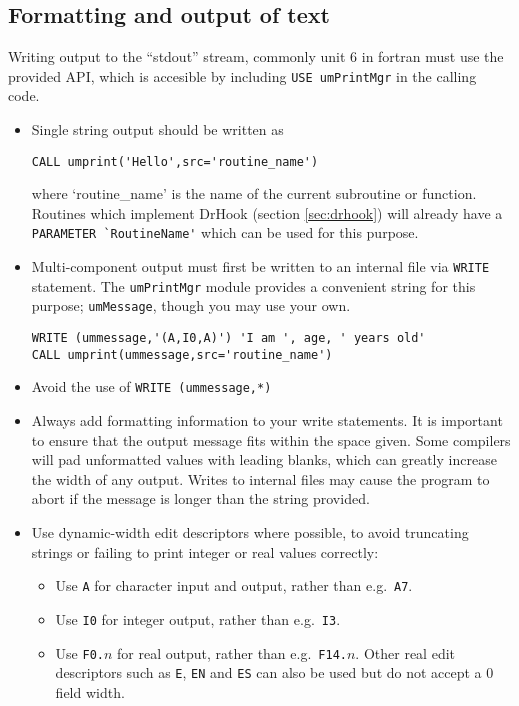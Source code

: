 \subsection{Formatting and output of text}\label{sec:format}

Writing output to the ``stdout'' stream, commonly unit 6 in fortran must use the provided API, which is accesible by including \verb|USE umPrintMgr| in the calling code.
\begin{itemize}
\item Single string output should be written as
\begin{verbatim}
CALL umprint('Hello',src='routine_name')
\end{verbatim}
where `routine\_name' is the name of the current subroutine or function.
Routines which implement DrHook (section \ref{sec:drhook}) will already have a
\verb|PARAMETER `RoutineName'| which can be used for this purpose.
\item Multi-component output must first be written to an internal file via \verb|WRITE| statement. The \verb|umPrintMgr| module provides a convenient string for this purpose; \verb|umMessage|, though you may use your own.
\begin{verbatim}
WRITE (ummessage,'(A,I0,A)') 'I am ', age, ' years old'
CALL umprint(ummessage,src='routine_name')
\end{verbatim}
\item Avoid the use of \verb|WRITE (ummessage,*) |
\item Always add formatting information to your write statements.
It is important to ensure that the output message fits within the space given.
Some compilers will pad unformatted values with leading blanks, which can
greatly increase the width of any output. Writes to internal files may cause
the program to abort if the message is longer than the string provided.
\item Use dynamic-width edit descriptors where possible, to avoid truncating
strings or failing to print integer or real values correctly:
  \begin{itemize}
  \item Use \verb|A| for character input and output, rather than e.g.\ \verb|A7|.
  \item Use \verb|I0| for integer output, rather than e.g.\ \verb|I3|.
  \item Use \verb|F0.|$n$ for real output, rather than e.g.\ \verb|F14.|$n$.
  Other real edit descriptors such as \verb|E|, \verb|EN| and \verb|ES| can
  also be used but do not accept a 0 field width.

\end{itemize}
\end{itemize}
